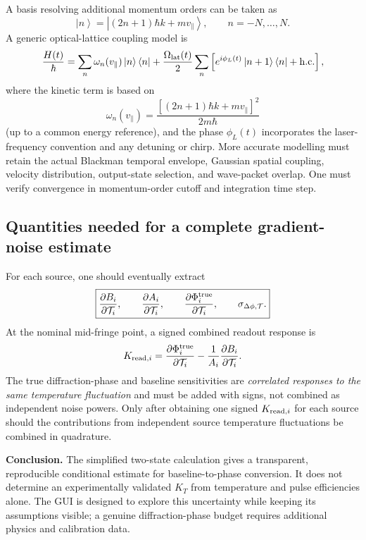 \documentclass[11pt,a4paper]{article}
\numberwithin{equation}{section}
\newcommand{\Tat}{\mathcal{T}}
\newcommand{\ket}[1]{\left|#1\right\rangle}
\newcommand{\bra}[1]{\left\langle #1\right|}
\begin{document}
A basis resolving additional momentum orders can be taken as
\begin{equation}
\ket n=\ket{(2n+1)\hbar k+m v_\parallel},\qquad n=-N,\ldots,N.
\end{equation}
A generic optical-lattice coupling model is
\begin{equation}\label{eq:multiH}
\frac{H(t)}\hbar=
\sum_n\omega_n(v_\parallel)\ket n\bra n
+\frac{\Omega_{\rm lat}(t)}2
\sum_n\left[e^{i\phi_L(t)}\ket{n+1}\bra n+\mathrm{h.c.}\right],
\end{equation}
where the kinetic term is based on
\begin{equation}
\omega_n(v_\parallel)=
\frac{[(2n+1)\hbar k+m v_\parallel]^2}{2m\hbar}
\end{equation}
(up to a common energy reference), and the phase $\phi_L(t)$ incorporates
the laser-frequency convention and any detuning or chirp. More accurate
modelling must retain the actual Blackman temporal envelope, Gaussian spatial
coupling, velocity distribution, output-state selection, and wave-packet
overlap. One must verify convergence in momentum-order cutoff and integration
time step.

\subsection{Quantities needed for a complete gradient-noise estimate}

For each source, one should eventually extract
\begin{equation}
\boxed{\frac{\partial B_i}{\partial\Tat_i},\qquad
\frac{\partial A_i}{\partial\Tat_i},\qquad
\frac{\partial\Phi_i^{\rm true}}{\partial\Tat_i},\qquad
\sigma_{\Delta\phi,\Tat}.}
\end{equation}
At the nominal mid-fringe point, a signed combined readout response is
\begin{equation}
K_{{\rm read},i}=
\frac{\partial\Phi_i^{\rm true}}{\partial\Tat_i}
-\frac{1}{A_i}\frac{\partial B_i}{\partial\Tat_i}.
\end{equation}
The true diffraction-phase and baseline sensitivities are \emph{correlated
responses to the same temperature fluctuation} and must be added with signs,
not combined as independent noise powers. Only after obtaining one signed
$K_{{\rm read},i}$ for each source should the contributions from independent
source temperature fluctuations be combined in quadrature.

\begin{keybox}
\textbf{Conclusion.} The simplified two-state calculation gives a transparent,
reproducible conditional estimate for baseline-to-phase conversion. It does
not determine an experimentally validated $K_T$ from temperature and pulse
efficiencies alone. The GUI is designed to explore this uncertainty while
keeping its assumptions visible; a genuine diffraction-phase budget requires
additional physics and calibration data.
\end{keybox}
\end{document}
